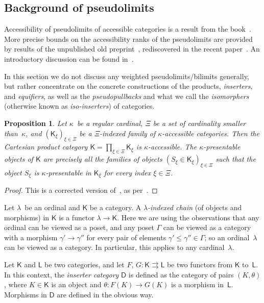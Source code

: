 \documentclass[12pt,a4paper]{amsart}
\newcommand{\+}{\protect\nobreakdash-}
\renewcommand{\:}{\colon}
\newcommand{\rarrow}{\longrightarrow}
\newcommand{\sD}{\mathsf D}
\newcommand{\sK}{\mathsf K}
\newcommand{\sL}{\mathsf L}
\theoremstyle{plain}
\newtheorem{prop}[thm]{Proposition}
\theoremstyle{definition}
\begin{document}
\subsection{Background of pseudolimits}
\label{pseudolimits-subsecn}
 Accessibility of pseudolimits of accessible categories is
a result from the book~\cite[Theorem~5.1.6]{MP}.
 More precise bounds on the accessibility ranks of the pseudolimits
are provided by results of the unpublished old
preprint~\cite[Theorem~3.8, Corollary~3.9, and Remark~3.11(II)]{Ulm},
rediscovered in the recent paper~\cite{Pacc}.
 An introductory discussion can be found in~\cite[Section~2.H]{AR}.

 In this section we do not discuss any weighted pseudolimits/bilimits
generally, but rather concentrate on the concrete constructions of
the products, \emph{inserters}, and \emph{equifiers}, as well as
the \emph{pseudopullbacks} and what we call the \emph{isomorphers}
(otherwise known as \emph{iso-inserters}) of categories.

\begin{prop} \label{product-accessible-prop}
 Let\/ $\kappa$~be a regular cardinal, $\Xi$ be a set of cardinality
smaller than\/~$\kappa$, and $(\sK_\xi)_{\xi\in\Xi}$ be
a\/ $\Xi$\+indexed family of\/ $\kappa$\+accessible categories.
 Then the Cartesian product category\/ $\sK=\prod_{\xi\in\Xi}\sK_\xi$
is\/ $\kappa$\+accessible.
 The\/ $\kappa$\+presentable objects of\/ $\sK$ are precisely all
the families of objects $(S_\xi\in\sK_\xi)_{\xi\in\Xi}$ such that
the object $S_\xi$ is\/ $\kappa$\+presentable in\/ $\sK_\xi$ for
every index\/ $\xi\in\Xi$.
\end{prop}

\begin{proof}
 This is a corrected version of~\cite[Proposition~2.67]{AR},
as per~\cite[Proposition~2.1]{Pacc}.
\end{proof}

 Let $\lambda$~be an ordinal and $\sK$ be a category.
 A \emph{$\lambda$\+indexed chain} (of objects and morphisms) in $\sK$
is a functor $\lambda\rarrow\sK$.
 Here we are using the observations that any ordinal can be viewed as
a poset, and any poset $\Gamma$ can be viewed as a category with
a morphism $\gamma'\rarrow\gamma''$ for every pair of elements
$\gamma'\le\gamma''\in\Gamma$; so an ordinal~$\lambda$ can be viewed
as a category.
 In particular, this applies to any cardinal~$\lambda$.

 Let $\sK$ and $\sL$ be two categories, and let $F$, $G\:\sK
\rightrightarrows\sL$ be two functors from $\sK$ to~$\sL$.
 In this context, the \emph{inserter category} $\sD$ is defined
as the category of pairs $(K,\theta)$, where $K\in\sK$ is
an object and $\theta\:F(K)\rarrow G(K)$ is a morphism in~$\sL$.
 Morphisms in $\sD$ are defined in the obvious way.
\end{document}
